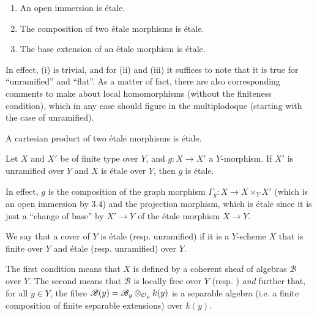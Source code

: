 \documentclass[../main.tex]{subfiles}
\begin{document}
\begin{prop}
    \begin{enumerate}[\normalfont(i)]
        \item An open immersion is étale.
        \item The composition of two étale morphisms is étale.
        \item The base extension of an étale morphism is étale.
    \end{enumerate}
\end{prop}

In effect, (i) is trivial, and for (ii) and (iii) it suffices to note that it is true for ``unramified'' and ``flat''.
As a matter of fact, there are also corresponding comments to make about local homomorphisms (without the finiteness condition), which in any case should figure in the multiplodoque (starting with the case of unramified).

\begin{cor}
    A cartesian product of two étale morphisms is étale.
\end{cor}

\begin{cor}
    Let $X$ and $X'$ be of finite type over $Y$, and $g\colon X\to X'$ a $Y$-morphism.
    If $X'$ is unramified over $Y$ and $X$ is étale over $Y$, then $g$ is étale.
\end{cor}

In effect, $g$ is the composition of the graph morphism $\Gamma_g\colon X\to X\times_Y X'$ (which is an open immersion by 3.4) and the projection morphism, which is étale since it is just a ``change of base'' by $X'\to Y$ of the étale morphism $X\to Y$.

\begin{defn}
    We say that a cover of $Y$ is étale (resp. unramified) if it is a $Y$-scheme $X$ that is finite over $Y$ and étale (resp. unramified) over $Y$.
\end{defn}
The first condition means that $X$ is defined by a coherent sheaf of algebras $\mathscr{B}$ over $Y$.
The second means that $\mathscr{B}$ is locally free over $Y$ (resp. ) \emph{and} further that, for all $y\in Y$, the fibre $\mathscr{B}(y)=\mathscr{B}_y\otimes_{\mathcal{O}_y}k(y)$ is a separable algebra (i.e. a finite composition of finite separable extensions) over $k(y)$.
\end{document}
